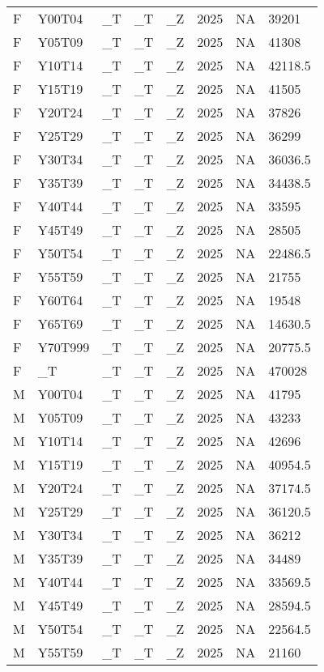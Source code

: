 \begin{longtable}[t]{llllllll}
F & Y00T04 & \_T & \_T & \_Z & 2025 & NA & 39201\\
\addlinespace
F & Y05T09 & \_T & \_T & \_Z & 2025 & NA & 41308\\
F & Y10T14 & \_T & \_T & \_Z & 2025 & NA & 42118.5\\
F & Y15T19 & \_T & \_T & \_Z & 2025 & NA & 41505\\
F & Y20T24 & \_T & \_T & \_Z & 2025 & NA & 37826\\
F & Y25T29 & \_T & \_T & \_Z & 2025 & NA & 36299\\
\addlinespace
F & Y30T34 & \_T & \_T & \_Z & 2025 & NA & 36036.5\\
F & Y35T39 & \_T & \_T & \_Z & 2025 & NA & 34438.5\\
F & Y40T44 & \_T & \_T & \_Z & 2025 & NA & 33595\\
F & Y45T49 & \_T & \_T & \_Z & 2025 & NA & 28505\\
F & Y50T54 & \_T & \_T & \_Z & 2025 & NA & 22486.5\\
\addlinespace
F & Y55T59 & \_T & \_T & \_Z & 2025 & NA & 21755\\
F & Y60T64 & \_T & \_T & \_Z & 2025 & NA & 19548\\
F & Y65T69 & \_T & \_T & \_Z & 2025 & NA & 14630.5\\
F & Y70T999 & \_T & \_T & \_Z & 2025 & NA & 20775.5\\
F & \_T & \_T & \_T & \_Z & 2025 & NA & 470028\\
\addlinespace
M & Y00T04 & \_T & \_T & \_Z & 2025 & NA & 41795\\
M & Y05T09 & \_T & \_T & \_Z & 2025 & NA & 43233\\
M & Y10T14 & \_T & \_T & \_Z & 2025 & NA & 42696\\
M & Y15T19 & \_T & \_T & \_Z & 2025 & NA & 40954.5\\
M & Y20T24 & \_T & \_T & \_Z & 2025 & NA & 37174.5\\
\addlinespace
M & Y25T29 & \_T & \_T & \_Z & 2025 & NA & 36120.5\\
M & Y30T34 & \_T & \_T & \_Z & 2025 & NA & 36212\\
M & Y35T39 & \_T & \_T & \_Z & 2025 & NA & 34489\\
M & Y40T44 & \_T & \_T & \_Z & 2025 & NA & 33569.5\\
M & Y45T49 & \_T & \_T & \_Z & 2025 & NA & 28594.5\\
\addlinespace
M & Y50T54 & \_T & \_T & \_Z & 2025 & NA & 22564.5\\
M & Y55T59 & \_T & \_T & \_Z & 2025 & NA & 21160\\

\end{longtable}
